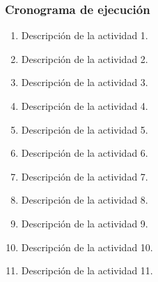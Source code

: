 		\blindtext
		
	\subsubsection{Cronograma de ejecución}

		\blindtext

		\vspace{10pt}

		\begin{enumerate}[label=\bfseries Actividad \arabic*:, wide=0pt, leftmargin=*]
			\item Descripción de la actividad 1. 
			\item Descripción de la actividad 2.
			\item Descripción de la actividad 3.
			\item Descripción de la actividad 4.
			\item Descripción de la actividad 5.
			\item Descripción de la actividad 6.
			\item Descripción de la actividad 7.
			\item Descripción de la actividad 8.
			\item Descripción de la actividad 9.
			\item Descripción de la actividad 10.
			\item Descripción de la actividad 11.
		\end{enumerate}

